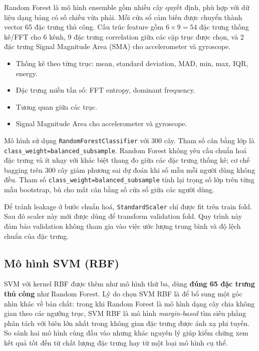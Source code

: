 \documentclass[12pt,a4paper]{article}
\begin{document}
Random Forest là mô hình ensemble gồm nhiều cây quyết định, phù hợp với dữ liệu dạng bảng có số chiều vừa phải. Mỗi cửa sổ cảm biến được chuyển thành vector 65 đặc trưng thủ công. Cấu trúc feature gồm \(6 \times 9 = 54\) đặc trưng thống kê/FFT cho 6 kênh, 9 đặc trưng correlation giữa các cặp trục được chọn, và 2 đặc trưng Signal Magnitude Area (SMA) cho accelerometer và gyroscope.

\begin{itemize}
    \item Thống kê theo từng trục: mean, standard deviation, MAD, min, max, IQR, energy.
    \item Đặc trưng miền tần số: FFT entropy, dominant frequency.
    \item Tương quan giữa các trục.
    \item Signal Magnitude Area cho accelerometer và gyroscope.
\end{itemize}

Mô hình sử dụng \texttt{RandomForestClassifier} với 300 cây. Tham số cân bằng lớp là \texttt{class\_weight=balanced\_subsample}. Random Forest không yêu cầu chuẩn hoá đặc trưng và ít nhạy với khác biệt thang đo giữa các đặc trưng thống kê; cơ chế bagging trên 300 cây giảm phương sai dự đoán khi số mẫu mỗi người dùng không đều. Tham số \texttt{class\_weight=balanced\_subsample} tính lại trọng số lớp trên từng mẫu bootstrap, bù cho mất cân bằng số cửa sổ giữa các người dùng.

Để tránh leakage ở bước chuẩn hoá, \texttt{StandardScaler} chỉ được fit trên train fold. Sau đó scaler này mới được dùng để transform validation fold. Quy trình này đảm bảo validation không tham gia vào việc ước lượng trung bình và độ lệch chuẩn của đặc trưng.

\subsection{Mô hình SVM (RBF)}

SVM với kernel RBF được thêm như mô hình thứ ba, dùng \textbf{đúng 65 đặc trưng thủ công} như Random Forest. Lý do chọn SVM RBF là để bổ sung một góc nhìn khác về bản chất: trong khi Random Forest là mô hình dạng cây chia không gian theo các ngưỡng trục, SVM RBF là mô hình \textit{margin-based} tìm siêu phẳng phân tách với biên lớn nhất trong không gian đặc trưng được ánh xạ phi tuyến. So sánh hai mô hình cùng đầu vào nhưng khác nguyên lý giúp kiểm chứng xem kết quả tốt đến từ chất lượng đặc trưng hay từ một loại mô hình cụ thể.
\end{document}
